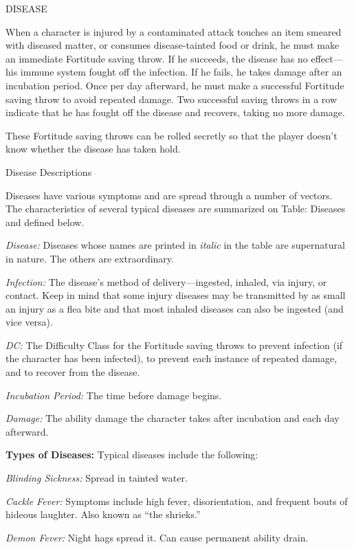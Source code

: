 \documentclass{article}
\begin{document}
\vspace{12pt}
\parindent=0pt
DISEASE

When a character is injured by a contaminated attack touches an item smeared with 
diseased matter, or consumes disease-tainted food or drink, he must make an immediate 
Fortitude saving throw. If he succeeds, the disease has no effect---his immune 
system fought off the infection. If he fails, he takes damage after an incubation 
period. Once per day afterward, he must make a successful Fortitude saving throw 
to avoid repeated damage. Two successful saving throws in a row indicate that he 
has fought off the disease and recovers, taking no more damage.

These Fortitude saving throws can be rolled secretly so that the player doesn't 
know whether the disease has taken hold.

Disease Descriptions

Diseases have various symptoms and are spread through a number of vectors. The 
characteristics of several typical diseases are summarized on Table: Diseases and 
defined below.

\textit{Disease: }Diseases whose names are printed in \textit{italic }in the table 
are supernatural in nature. The others are extraordinary.

\textit{Infection: }The disease's method of delivery---ingested, inhaled, via injury, 
or contact. Keep in mind that some injury diseases may be transmitted by as small 
an injury as a flea bite and that most inhaled diseases can also be ingested (and 
vice versa).

\textit{DC: }The Difficulty Class for the Fortitude saving throws to prevent infection 
(if the character has been infected), to prevent each instance of repeated damage, 
and to recover from the disease.

\textit{Incubation Period: }The time before damage begins.

\textit{Damage: }The ability damage the character takes after incubation and each 
day afterward.

\textbf{Types of Diseases: }Typical diseases include the following:

\textit{Blinding Sickness: }Spread in tainted water.

\textit{Cackle Fever: }Symptoms include high fever, disorientation, and frequent 
bouts of hideous laughter. Also known as ``the shrieks.''

\textit{Demon Fever: }Night hags spread it. Can cause permanent ability drain.
\end{document}
